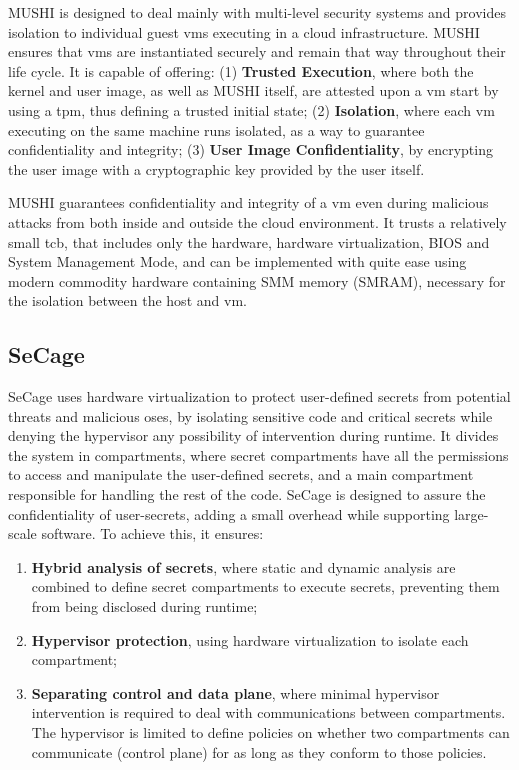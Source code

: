 MUSHI \cite{mushiPaper} is designed to deal mainly with multi-level security systems and provides isolation to individual guest \gls{vm}s executing in a cloud infrastructure. MUSHI ensures that \gls{vm}s are instantiated securely and remain that way throughout their life cycle. 
It is capable of offering: (1) \textbf{Trusted Execution}, where both the kernel and user image, as well as MUSHI itself, are attested upon a \gls{vm} start by using a \gls{tpm}, thus defining a trusted initial state; (2) \textbf{Isolation}, where each \gls{vm} executing on the same machine runs isolated, as a way to guarantee confidentiality and integrity; (3) \textbf{User Image Confidentiality}, by encrypting the user image with a cryptographic key provided by the user itself.

MUSHI guarantees confidentiality and integrity of a \gls{vm} even during malicious attacks from both inside and outside the cloud environment.
It trusts a relatively small \gls{tcb}, that includes only the hardware, hardware virtualization, BIOS and System Management Mode, and can be implemented with quite ease using modern commodity hardware containing SMM memory (SMRAM), necessary for the isolation between the host and \gls{vm}.\newline


\subsection{SeCage} 

SeCage \cite{SeCagePaper} uses hardware virtualization to protect user-defined secrets from potential threats and malicious \gls{os}es, by isolating sensitive code and critical secrets while denying the hypervisor any possibility of intervention during runtime.
It divides the system in compartments, where secret compartments have all the permissions to access and manipulate the user-defined secrets, and a main compartment responsible for handling the rest of the code.
SeCage is designed to assure the confidentiality of user-secrets, adding a small overhead while supporting large-scale software. To achieve this, it ensures:
\begin{enumerate}
	\item \textbf{Hybrid analysis of secrets}, where static and dynamic analysis are combined to define secret compartments to execute secrets, preventing them from being disclosed during runtime;
	\item \textbf{Hypervisor protection}, using hardware virtualization to isolate each compartment;
	\item \textbf{Separating control and data plane}, where minimal hypervisor intervention is required to deal with communications between compartments. The hypervisor is limited to define policies on whether two compartments can communicate (control plane) for as long as they conform to those policies.\newline
\end{enumerate}


